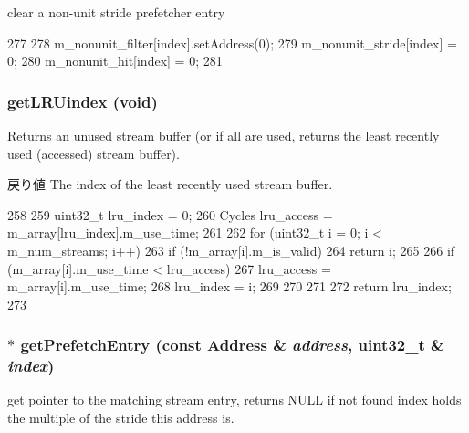 clear a non-\/unit stride prefetcher entry 


\begin{DoxyCode}
277 {
278     m_nonunit_filter[index].setAddress(0);
279     m_nonunit_stride[index] = 0;
280     m_nonunit_hit[index]    = 0;
281 }
\end{DoxyCode}
\hypertarget{classPrefetcher_ae2a3897ee6d47f9e162f17bea5f21a11}{
\subsubsection[{getLRUindex}]{ getLRUindex (void)}}
\label{classPrefetcher_ae2a3897ee6d47f9e162f17bea5f21a11}
Returns an unused stream buffer (or if all are used, returns the least recently used (accessed) stream buffer). \begin{DoxyReturn}{戻り値}
The index of the least recently used stream buffer. 
\end{DoxyReturn}



\begin{DoxyCode}
258 {
259     uint32_t lru_index = 0;
260     Cycles lru_access = m_array[lru_index].m_use_time;
261 
262     for (uint32_t i = 0; i < m_num_streams; i++) {
263         if (!m_array[i].m_is_valid) {
264             return i;
265         }
266         if (m_array[i].m_use_time < lru_access) {
267             lru_access = m_array[i].m_use_time;
268             lru_index = i;
269         }
270     }
271 
272     return lru_index;
273 }
\end{DoxyCode}
\hypertarget{classPrefetcher_a9d6cbff2a87bd34af85710cae48c6077}{
\subsubsection[{getPrefetchEntry}]{ $\ast$ getPrefetchEntry (const {\bf Address} \& {\em address}, \/  {\bf uint32\_\-t} \& {\em index})}}
\label{classPrefetcher_a9d6cbff2a87bd34af85710cae48c6077}
get pointer to the matching stream entry, returns NULL if not found index holds the multiple of the stride this address is. 


